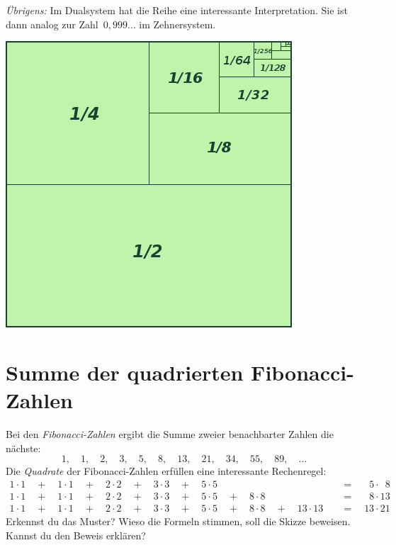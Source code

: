 \documentclass{../../zirkelblatt}
\begin{document}
\emph{Übrigens:} Im Dualsystem hat die Reihe eine interessante Interpretation. Sie
ist dann analog zur Zahl~$0{,}999\ldots$ im Zehnersystem.
\begin{center}
\includegraphics[scale=0.5]{geometrische-reihe-4}
\end{center}


\newpage
\section*{Summe der quadrierten Fibonacci-Zahlen}
Bei den \emph{Fibonacci-Zahlen} ergibt die Summe zweier benachbarter Zahlen die
nächste:
\[ 1,\quad 1,\quad 2,\quad 3,\quad 5,\quad 8,\quad 13,\quad 21,\quad 34,\quad 55,\quad 89,\quad \ldots \]
Die \emph{Quadrate} der Fibonacci-Zahlen erfüllen eine interessante Rechenregel:
\begin{align*}
  1\cdot1 \quad+\quad 1\cdot1 \quad+\quad 2\cdot2 \quad+\quad 3\cdot3 \quad+\quad 5\cdot5 \phantom{{} \quad+\quad 8\cdot8 \quad+\quad 13\cdot13}
    &{\quad}=\quad \phantom{0}5 \cdot \phantom{0}8 \\
  1\cdot1 \quad+\quad 1\cdot1 \quad+\quad 2\cdot2 \quad+\quad 3\cdot3 \quad+\quad 5\cdot5 \quad+\quad 8\cdot8 \phantom{{} \quad+\quad 13\cdot13}
    &{\quad}=\quad \phantom{0}8 \cdot 13 \\
  1\cdot1 \quad+\quad 1\cdot1 \quad+\quad 2\cdot2 \quad+\quad 3\cdot3 \quad+\quad 5\cdot5 \quad+\quad 8\cdot8 \quad+\quad 13\cdot13
    &{\quad}=\quad 13 \cdot 21
\end{align*}
Erkennst du das Muster? Wieso die Formeln stimmen, soll die Skizze beweisen.
Kannst du den Beweis erklären?
\end{document}
